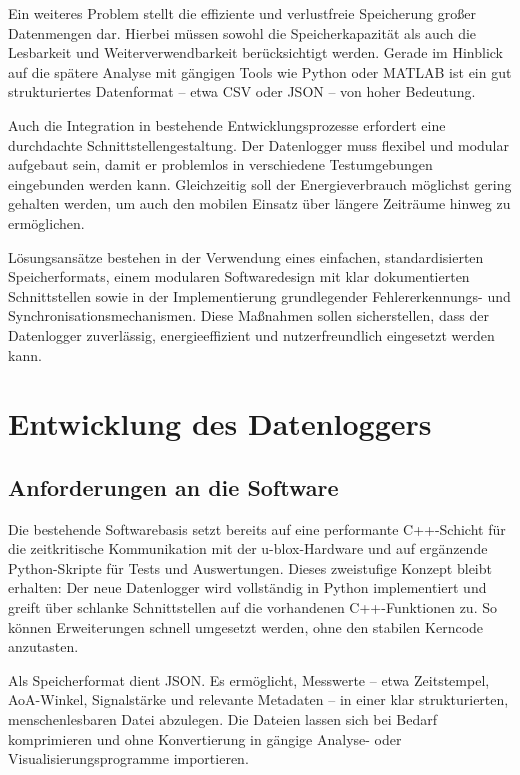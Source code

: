 \documentclass[a4paper, 12pt]{article} %
\begin{document}
Ein weiteres Problem stellt die effiziente und verlustfreie Speicherung großer Datenmengen dar. 
Hierbei müssen sowohl die Speicherkapazität als auch die Lesbarkeit und Weiterverwendbarkeit berücksichtigt werden. Gerade 
im Hinblick auf die spätere Analyse mit gängigen Tools wie Python oder MATLAB ist ein gut strukturiertes Datenformat – etwa \ac{CSV} oder \ac{JSON} – von 
hoher Bedeutung.

Auch die Integration in bestehende Entwicklungsprozesse erfordert eine durchdachte Schnittstellengestaltung.
 Der Datenlogger muss flexibel und modular aufgebaut sein, damit er problemlos in verschiedene Testumgebungen 
 eingebunden werden kann. Gleichzeitig soll der Energieverbrauch möglichst gering gehalten werden, um auch den mobilen Einsatz über längere
  Zeiträume hinweg zu ermöglichen.

Lösungsansätze bestehen in der Verwendung eines einfachen, standardisierten Speicherformats, einem modularen 
Softwaredesign mit klar dokumentierten Schnittstellen sowie in der Implementierung grundlegender Fehlererkennungs- und Synchronisationsmechanismen. 
Diese Maßnahmen sollen sicherstellen, dass der Datenlogger zuverlässig, energieeffizient und nutzerfreundlich eingesetzt werden kann.

\clearpage

\section{Entwicklung des Datenloggers}
\subsection{Anforderungen an die Software}
Die bestehende Softwarebasis setzt bereits auf eine performante C++-Schicht für die zeitkritische Kommunikation mit 
der u-blox-Hardware und auf ergänzende Python-Skripte für Tests und Auswertungen. Dieses zweistufige Konzept bleibt erhalten: 
Der neue Datenlogger wird vollständig in Python implementiert und greift über schlanke Schnittstellen auf die vorhandenen C++-Funktionen zu. 
So können Erweiterungen schnell umgesetzt werden, ohne den stabilen Kerncode anzutasten.

Als Speicherformat dient \ac{JSON}. Es ermöglicht, Messwerte – etwa Zeitstempel, \ac{AoA}-Winkel, Signalstärke und relevante Metadaten – in einer 
klar strukturierten, menschenlesbaren Datei abzulegen. Die Dateien lassen sich bei Bedarf komprimieren und ohne Konvertierung in gängige 
Analyse- oder Visualisierungsprogramme importieren.
\end{document}
